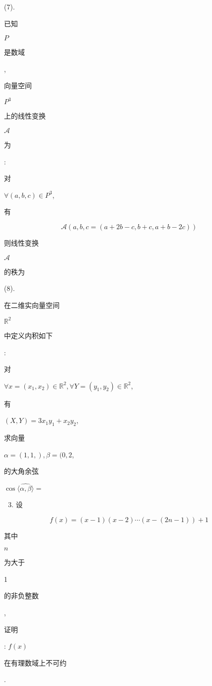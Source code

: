 \documentclass[10pt]{article}
\begin{document}
(7). \begin{CJK}{UTF8}{mj}已知\end{CJK} $P$ \begin{CJK}{UTF8}{mj}是数域\end{CJK}, \begin{CJK}{UTF8}{mj}向量空间\end{CJK} $P^{3}$ \begin{CJK}{UTF8}{mj}上的线性变换\end{CJK} $\mathscr{A}$ \begin{CJK}{UTF8}{mj}为\end{CJK}: \begin{CJK}{UTF8}{mj}对\end{CJK} $\forall(a, b, c) \in P^{3}$, \begin{CJK}{UTF8}{mj}有\end{CJK}
$$
\mathscr{A}(a, b, c=(a+2 b-c, b+c, a+b-2 c))
$$
\begin{CJK}{UTF8}{mj}则线性变换\end{CJK} $\mathscr{A}$ \begin{CJK}{UTF8}{mj}的秩为\end{CJK}

(8). \begin{CJK}{UTF8}{mj}在二维实向量空间\end{CJK} $\mathbb{R}^{2}$ \begin{CJK}{UTF8}{mj}中定义内积如下\end{CJK}: \begin{CJK}{UTF8}{mj}对\end{CJK} $\forall x=\left(x_{1}, x_{2}\right) \in \mathbb{R}^{2}, \forall Y=\left(y_{1}, y_{2}\right) \in \mathbb{R}^{2}$, \begin{CJK}{UTF8}{mj}有\end{CJK} $(X, Y)=3 x_{1} y_{1}+x_{2} y_{2}$, \begin{CJK}{UTF8}{mj}求向量\end{CJK} $\alpha=(1,1,), \beta=(0,2$, \begin{CJK}{UTF8}{mj}的大角余弦\end{CJK} $\cos \langle\widehat{\alpha, \beta}\rangle=$

\begin{enumerate}
  \setcounter{enumi}{2}
  \item \begin{CJK}{UTF8}{mj}设\end{CJK}
\end{enumerate}
$$
f(x)=(x-1)(x-2) \cdots(x-(2 n-1))+1
$$
\begin{CJK}{UTF8}{mj}其中\end{CJK} $n$ \begin{CJK}{UTF8}{mj}为大于\end{CJK} 1 \begin{CJK}{UTF8}{mj}的非负整数\end{CJK}, \begin{CJK}{UTF8}{mj}证明\end{CJK}: $f(x)$ \begin{CJK}{UTF8}{mj}在有理数域上不可约\end{CJK}.
\end{document}
